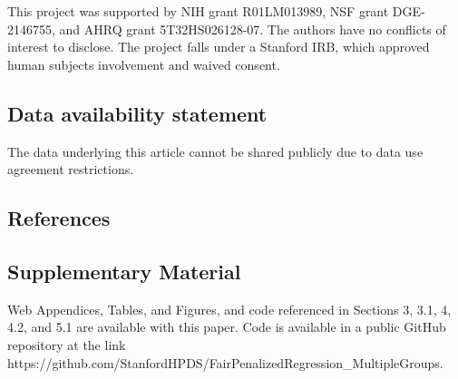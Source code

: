 \documentclass[
  12pt]{article}
\begin{document}
This project was supported by NIH grant R01LM013989, NSF grant
DGE-2146755, and AHRQ grant 5T32HS026128-07. The authors have no
conflicts of interest to disclose. The project falls under a Stanford
IRB, which approved human subjects involvement and waived consent.

\subsection*{Data availability
statement}\label{data-availability-statement}

The data underlying this article cannot be shared publicly due to data
use agreement restrictions.

\subsection*{References}\label{references}

\renewcommand{\bibsection}{}


\subsection*{Supplementary Material}\label{supplementary-material}

Web Appendices, Tables, and Figures, and code referenced in Sections 3,
3.1, 4, 4.2, and 5.1 are available with this paper. Code is available in
a public GitHub repository at the link
https://github.com/StanfordHPDS/FairPenalizedRegression\_MultipleGroups.

\newpage{}
\end{document}
